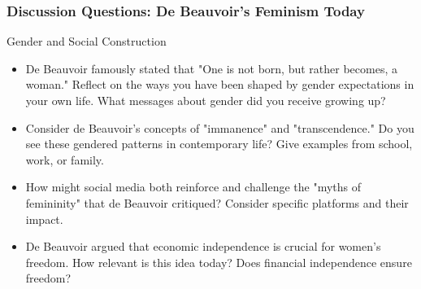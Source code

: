 \documentclass[aspectratio=169]{beamer}
\begin{document}
	\begin{frame}
		\frametitle{Discussion Questions: De Beauvoir's Feminism Today}
		\begin{block}{Gender and Social Construction}
			\begin{itemize}
				\item De Beauvoir famously stated that "One is not born, but rather becomes, a woman." Reflect on the ways you have been shaped by gender expectations in your own life. What messages about gender did you receive growing up?
				\item Consider de Beauvoir's concepts of "immanence" and "transcendence." Do you see these gendered patterns in contemporary life? Give examples from school, work, or family.
				\item How might social media both reinforce and challenge the "myths of femininity" that de Beauvoir critiqued? Consider specific platforms and their impact.
				\item De Beauvoir argued that economic independence is crucial for women's freedom. How relevant is this idea today? Does financial independence ensure freedom?
			\end{itemize}
		\end{block}
		
	\end{frame}
\end{document}
